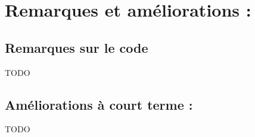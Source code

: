 \section{Remarques et améliorations  :}

\subsection{Remarques sur le code}
TODO

\subsection{Améliorations à court terme :}
TODO